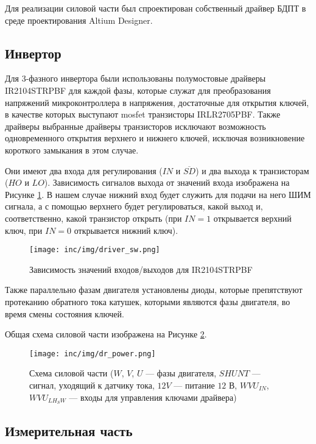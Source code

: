 Для реализации силовой части был спроектирован собственный драйвер БДПТ в среде проектирования Altium Designer.

\subsection{Инвертор}

Для 3-фазного инвертора были использованы полумостовые драйверы IR2104STRPBF для каждой фазы, которые служат для преобразования напряжений микроконтроллера в напряжения, достаточные для открытия ключей, в качестве которых выступают mosfet транзисторы IRLR2705PBF. Также драйверы выбранные драйверы транзисторов исключают возможность одновременного открытия верхнего и нижнего ключей, исключая возникновение короткого замыкания в этом случае.

Они имеют два входа для регулирования ($IN$ и $\overline{SD}$) и два выхода к транзисторам ($HO$ и $LO$). Зависимость сигналов выхода от значений входа изображена на Рисунке \ref{pic:driver_sw}. В нашем случае нижний вход будет служить для подачи на него ШИМ сигнала, а с помощью верхнего будет регулироваться, какой выход и, соответственно, какой транзистор открыть (при $IN=1$ открывается верхний ключ, при $IN=0$ открывается нижний ключ).

\begin{figure}[!h]
\centering
\texttt{[image: inc/img/driver\_sw.png]}
\caption{Зависимость значений входов/выходов для IR2104STRPBF}
\label{pic:driver_sw}
\end{figure}

Также параллельно фазам двигателя установлены диоды, которые препятствуют протеканию обратного тока катушек, которыми являются фазы двигателя, во время смены состояния ключей.

Общая схема силовой части изображена на Рисунке \ref{pic:dr_power}.

\begin{figure}[!h]
\centering
\texttt{[image: inc/img/dr\_power.png]}
\caption{Схема силовой части ($W$, $V$, $U$ --- фазы двигателя, $SHUNT$ --- сигнал, уходящий к датчику тока, $12V$ --- питание $12$ В, $WVU_{IN}$, $WVU_{LH_SW}$ --- входы для управления ключами драйвера)}
\label{pic:dr_power}
\end{figure}
\clearpage
\subsection{Измерительная часть}

